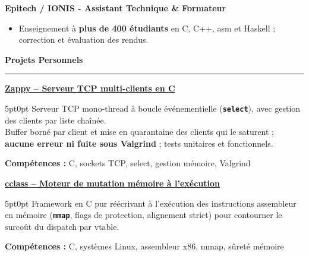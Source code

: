 \documentclass[9pt]{extarticle}
\begin{document}
\par\vspace{5pt}

{\bfseries Epitech / IONIS - Assistant Technique \& Formateur}
\begin{itemize}[noitemsep, topsep=0pt]
	\item Enseignement à {\bfseries plus de 400 étudiants} en C, C++, asm et Haskell ; correction et évaluation des rendus.
\end{itemize}

\par\vspace{5pt}

{\large\bfseries Projets Personnels}
\par\vspace{-8pt}
\rule{\linewidth}{0.4pt}
\par\vspace{5pt}

\underline{\bfseries Zappy -- Serveur TCP multi-clients en C}
\par
\begin{adjustwidth}{5pt}{0pt}
    Serveur TCP mono-thread à boucle événementielle ({\bfseries \texttt{select}}), avec gestion des clients par liste chaînée. \\
    Buffer borné par client et mise en quarantaine des clients qui le saturent ; {\bfseries aucune erreur ni fuite sous Valgrind} ; tests unitaires et fonctionnels.
\end{adjustwidth}
\par
{\bfseries Compétences :} C, sockets TCP, select, gestion mémoire, Valgrind

\par\vspace{8pt}

\underline{\bfseries \href{https://github.com/paulogarithm/cclass}{cclass} -- Moteur de mutation mémoire à l'exécution}
\par
\begin{adjustwidth}{5pt}{0pt}
    Framework en C pur réécrivant à l'exécution des instructions assembleur en mémoire ({\bfseries \texttt{mmap}}, flags de protection, alignement strict) pour contourner le surcoût du dispatch par vtable.
\end{adjustwidth}
\par
{\bfseries Compétences :} C, systèmes Linux, assembleur x86, mmap, sûreté mémoire

\par\vspace{8pt}
\end{document}
